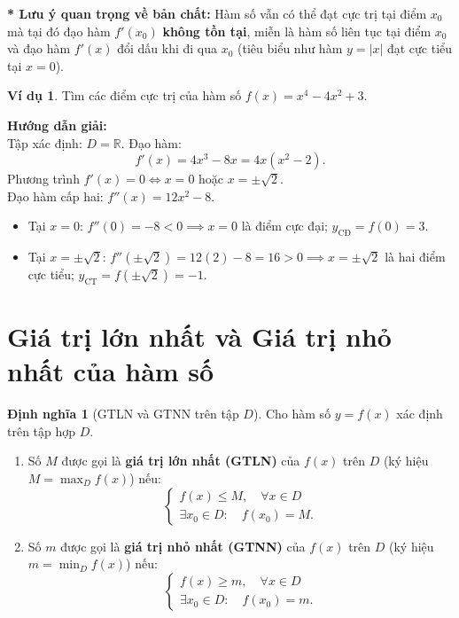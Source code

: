 \documentclass[12pt,a4paper]{article}
\theoremstyle{definition}
\newtheorem{dn}{Định nghĩa}[section]
\newtheorem{vd}{Ví dụ}[section]
\begin{document}
\noindent \textbf{* Lưu ý quan trọng về bản chất:} Hàm số vẫn có thể đạt cực trị tại điểm $x_0$ mà tại đó đạo hàm $f'(x_0)$ \textbf{không tồn tại}, miễn là hàm số liên tục tại điểm $x_0$ và đạo hàm $f'(x)$ đổi dấu khi đi qua $x_0$ (tiêu biểu như hàm $y = |x|$ đạt cực tiểu tại $x = 0$).

\begin{vd}
Tìm các điểm cực trị của hàm số $f(x) = x^4 - 4x^2 + 3$.
\end{vd}
\noindent \textbf{Hướng dẫn giải:} \\
Tập xác định: $D = \mathbb{R}$. Đạo hàm:
\[
f'(x) = 4x^3 - 8x = 4x(x^2 - 2).
\]
Phương trình $f'(x) = 0 \iff x = 0$ hoặc $x = \pm\sqrt{2}$. \\
Đạo hàm cấp hai: $f''(x) = 12x^2 - 8$.
\begin{itemize}
    \item Tại $x = 0$: $f''(0) = -8 < 0 \implies x = 0$ là điểm cực đại; $y_{\text{CĐ}} = f(0) = 3$.
    \item Tại $x = \pm\sqrt{2}$: $f''(\pm\sqrt{2}) = 12(2) - 8 = 16 > 0 \implies x = \pm\sqrt{2}$ là hai điểm cực tiểu; $y_{\text{CT}} = f(\pm\sqrt{2}) = -1$.
\end{itemize}

\vspace{5mm}
\section{Giá trị lớn nhất và Giá trị nhỏ nhất của hàm số}

\begin{dn}[GTLN và GTNN trên tập $D$]
Cho hàm số $y = f(x)$ xác định trên tập hợp $D$.
\begin{enumerate}
    \item[a)] Số $M$ được gọi là \textbf{giá trị lớn nhất (GTLN)} của $f(x)$ trên $D$ (ký hiệu $M = \max_{D} f(x)$) nếu:
    \[
    \begin{cases}
    f(x) \le M, \quad \forall x \in D \\
    \exists x_0 \in D: \quad f(x_0) = M.
    \end{cases}
    \]
    \item[b)] Số $m$ được gọi là \textbf{giá trị nhỏ nhất (GTNN)} của $f(x)$ trên $D$ (ký hiệu $m = \min_{D} f(x)$) nếu:
    \[
    \begin{cases}
    f(x) \ge m, \quad \forall x \in D \\
    \exists x_0 \in D: \quad f(x_0) = m.
    \end{cases}
    \]
\end{enumerate}
\end{dn}
\end{document}
